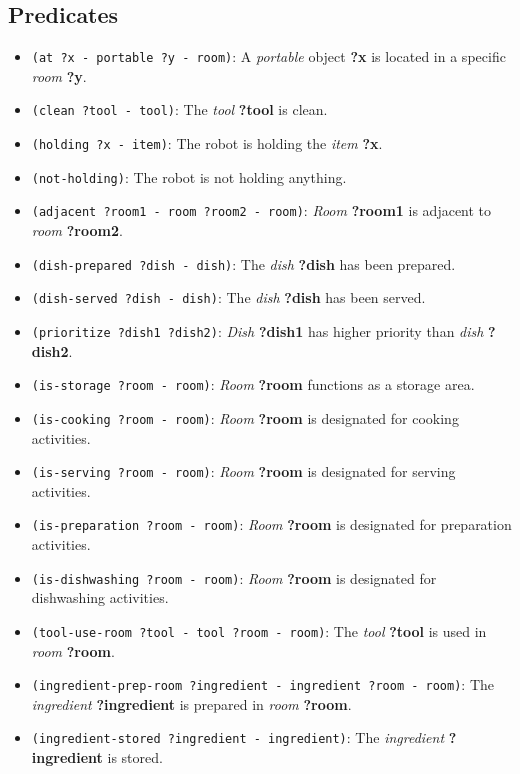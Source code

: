 \documentclass[a4paper,12pt]{article}
\begin{document}
\subsection{Predicates}
\begin{itemize}
    \item \texttt{(at ?x - portable ?y - room)}: A \textit{portable} object \textbf{?x} is located in a specific \textit{room} \textbf{?y}.
    \item \texttt{(clean ?tool - tool)}: The \textit{tool} \textbf{?tool} is clean.
    \item \texttt{(holding ?x - item)}: The robot is holding the \textit{item} \textbf{?x}.
    \item \texttt{(not-holding)}: The robot is not holding anything.
    \item \texttt{(adjacent ?room1 - room ?room2 - room)}: \textit{Room} \textbf{?room1} is adjacent to \textit{room} \textbf{?room2}.
    \item \texttt{(dish-prepared ?dish - dish)}: The \textit{dish} \textbf{?dish} has been prepared.
    \item \texttt{(dish-served ?dish - dish)}: The \textit{dish} \textbf{?dish} has been served.
    \item \texttt{(prioritize ?dish1 ?dish2)}: \textit{Dish} \textbf{?dish1} has higher priority than \textit{dish} \textbf{?dish2}.
    \item \texttt{(is-storage ?room - room)}: \textit{Room} \textbf{?room} functions as a storage area.
    \item \texttt{(is-cooking ?room - room)}: \textit{Room} \textbf{?room} is designated for cooking activities.
    \item \texttt{(is-serving ?room - room)}: \textit{Room} \textbf{?room} is designated for serving activities.
    \item \texttt{(is-preparation ?room - room)}: \textit{Room} \textbf{?room} is designated for preparation activities.
    \item \texttt{(is-dishwashing ?room - room)}: \textit{Room} \textbf{?room} is designated for dishwashing activities.
    \item \texttt{(tool-use-room ?tool - tool ?room - room)}: The \textit{tool} \textbf{?tool} is used in \textit{room} \textbf{?room}.
    \item \texttt{(ingredient-prep-room ?ingredient - ingredient ?room - room)}: The \textit{ingredient} \textbf{?ingredient} is prepared in \textit{room} \textbf{?room}.
    \item \texttt{(ingredient-stored ?ingredient - ingredient)}: The \textit{ingredient} \textbf{?ingredient} is stored.

\end{itemize}
\end{document}

